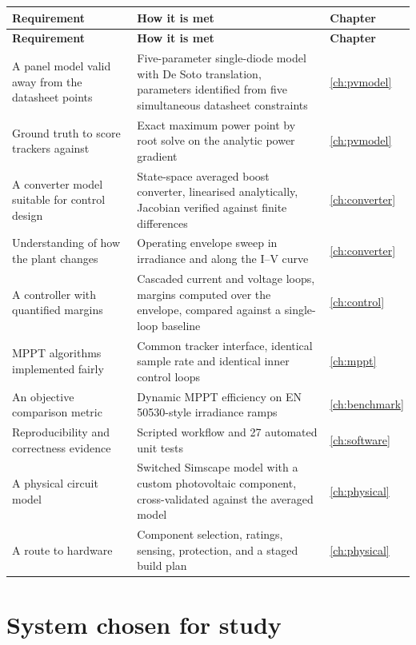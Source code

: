 \begin{longtable}{@{}L{0.40\textwidth}L{0.42\textwidth}L{0.12\textwidth}@{}}
\toprule
\textbf{Requirement} & \textbf{How it is met} & \textbf{Chapter} \\
\midrule
\endfirsthead
\toprule
\textbf{Requirement} & \textbf{How it is met} & \textbf{Chapter} \\
\midrule
\endhead
\bottomrule
\endfoot
A panel model valid away from the datasheet points & Five-parameter single-diode model with De Soto translation, parameters identified from five simultaneous datasheet constraints & \ref{ch:pvmodel} \\
Ground truth to score trackers against & Exact maximum power point by root solve on the analytic power gradient & \ref{ch:pvmodel} \\
A converter model suitable for control design & State-space averaged boost converter, linearised analytically, Jacobian verified against finite differences & \ref{ch:converter} \\
Understanding of how the plant changes & Operating envelope sweep in irradiance and along the I--V curve & \ref{ch:converter} \\
A controller with quantified margins & Cascaded current and voltage loops, margins computed over the envelope, compared against a single-loop baseline & \ref{ch:control} \\
MPPT algorithms implemented fairly & Common tracker interface, identical sample rate and identical inner control loops & \ref{ch:mppt} \\
An objective comparison metric & Dynamic MPPT efficiency on EN 50530-style irradiance ramps & \ref{ch:benchmark} \\
Reproducibility and correctness evidence & Scripted workflow and 27 automated unit tests & \ref{ch:software} \\
A physical circuit model & Switched Simscape model with a custom photovoltaic component, cross-validated against the averaged model & \ref{ch:physical} \\
A route to hardware & Component selection, ratings, sensing, protection, and a staged build plan & \ref{ch:physical} \\
\end{longtable}

\section{System chosen for study}

